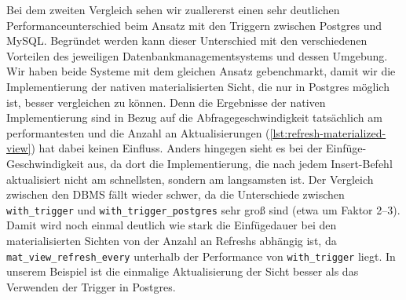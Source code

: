 Bei dem zweiten Vergleich sehen wir zuallererst einen sehr deutlichen Performanceunterschied beim Ansatz mit den Triggern zwischen Postgres und MySQL\@.
Begründet werden kann dieser Unterschied mit den verschiedenen Vorteilen des jeweiligen Datenbankmanagementsystems und dessen Umgebung.
Wir haben beide Systeme mit dem gleichen Ansatz gebenchmarkt, damit wir die Implementierung der nativen materialisierten Sicht, die nur in Postgres möglich ist, besser vergleichen zu können.
Denn die Ergebnisse der nativen Implementierung sind in Bezug auf die Abfragegeschwindigkeit tatsächlich am performantesten und die Anzahl an Aktualisierungen (\ref{lst:refresh-materialized-view}) hat dabei keinen Einfluss.
Anders hingegen sieht es bei der Einfüge-Geschwindigkeit aus, da dort die Implementierung, die nach jedem Insert-Befehl aktualisiert nicht am schnellsten, sondern am langsamsten ist.
Der Vergleich zwischen den DBMS fällt wieder schwer, da die Unterschiede zwischen \texttt{with\_trigger} und \texttt{with\_trigger\_postgres} sehr groß sind (etwa um Faktor 2--3).
Damit wird noch einmal deutlich wie stark die Einfügedauer bei den materialisierten Sichten von der Anzahl an Refreshs abhängig ist, da \texttt{mat\_view\_refresh\_every} unterhalb der Performance von \texttt{with\_trigger} liegt.
In unserem Beispiel ist die einmalige Aktualisierung der Sicht besser als das Verwenden der Trigger in Postgres.

